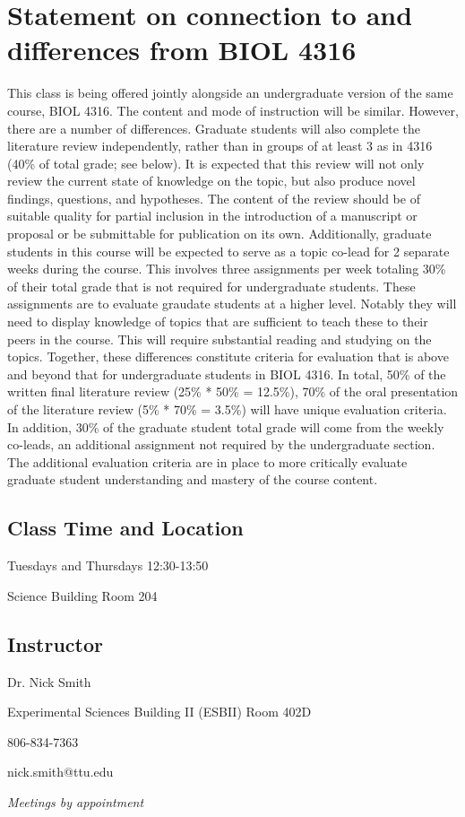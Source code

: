 \documentclass[12pt, notitlepage]{article}   	%
\begin{document}
{\section{Statement on connection to and differences from BIOL 4316}
This class is being offered jointly alongside an undergraduate version of the same course,
BIOL 4316. The content and mode of instruction will be similar. However,
there are a number of differences. Graduate students will also complete the literature
review independently, rather than in groups of at least 3 as in 4316 (40\% of total grade; see below).
It is expected that this review will not only review the current state
of knowledge on the topic, but also produce novel findings, questions, and hypotheses.
The content of the review should be of suitable quality for partial inclusion
in the introduction of a manuscript or proposal or be submittable for
publication on its own. Additionally, graduate
students in this course will be expected to serve as a topic co-lead for 2 separate weeks
during the course. This involves three assignments per week totaling 30\% of their total
grade that is not required for undergraduate students. These assignments are to evaluate
graudate students at a higher level. Notably they will need to display knowledge of topics
that are sufficient to teach these to their peers in the course. This will require
substantial reading and studying on the topics. Together, these differences constitute
criteria for evaluation that is above and beyond that for undergraduate students in BIOL 4316.
In total, 50\% of the written final literature review (25\% * 50\% = 12.5\%), 70\% of the
oral presentation of the literature review (5\% * 70\% = 3.5\%) will have unique evaluation criteria.
In addition, 30\% of the graduate student total grade will come from the weekly co-leads,
an additional assignment not required by the undergraduate section. The additional evaluation
criteria are in place to more critically evaluate graduate student understanding and mastery
of the course content.

\subsection{Class Time and Location}
Tuesdays and Thursdays 12:30-13:50

Science Building Room 204

\newpage

\subsection{Instructor}
Dr. Nick Smith \par
Experimental Sciences Building II (ESBII) Room 402D \par
806-834-7363 \par
nick.smith@ttu.edu \par
\textit{Meetings by appointment}

}
\end{document}
